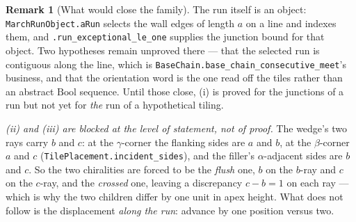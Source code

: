 \documentclass[11pt,reqno]{amsart}
\theoremstyle{plain}
\theoremstyle{definition}
\newtheorem{remark}[theorem]{Remark}
\begin{document}
\begin{remark}[What would close the family]
The run itself is an object: \texttt{MarchRunObject.aRun} selects the wall edges of length $a$ on a
line and indexes them, and \texttt{.run\_exceptional\_le\_one} supplies the junction bound for that
object. Two hypotheses remain unproved there --- that the selected run is contiguous along the line,
which is \texttt{BaseChain.base\_chain\_consecutive\_meet}'s business, and that the orientation word
is the one read off the tiles rather than an abstract $\mathrm{Bool}$ sequence. Until those close,
(i) is proved for the junctions of a run but not yet for \emph{the} run of a hypothetical tiling.

\emph{(ii) and (iii) are blocked at the level of statement, not of proof.} The wedge's two rays
carry $b$ and $c$: at the $\gamma$-corner the flanking sides are $a$ and $b$, at the $\beta$-corner
$a$ and $c$ (\texttt{TilePlacement.incident\_sides}), and the filler's $\alpha$-adjacent sides are
$b$ and $c$. So the two chiralities are forced to be the \emph{flush} one, $b$ on the $b$-ray and
$c$ on the $c$-ray, and the \emph{crossed} one, leaving a discrepancy $c-b=1$ on each ray --- which
is why the two children differ by one unit in apex height. What does not follow is the displacement
\emph{along the run}: advance by one position versus two.


\end{remark}
\end{document}
